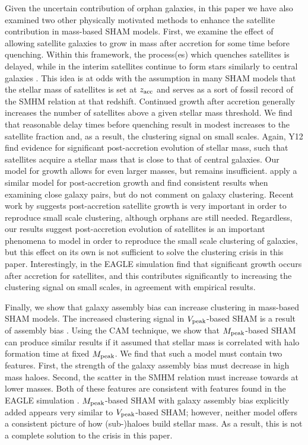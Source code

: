 \documentclass[useAMS,fleqn,usenatbib]{mnras}
\begin{document}
Given the uncertain contribution of orphan galaxies, in this paper we have also examined two other physically motivated methods to enhance the satellite contribution in mass-based SHAM models.  First, we examine the effect of allowing satellite galaxies to grow in mass after accretion for some time before quenching.  Within this framework, the process(es) which quenches satellites is delayed, while in the interim satellites continue to form stars similarly to central galaxies \citep{Wetzel:2013dw}.  This idea is at odds with the assumption in many SHAM models that the stellar mass of satellites is set at $z_{\rm acc}$ and serves as a sort of fossil record of the SMHM relation at that redshift.  Continued growth after accretion generally increases the number of satellites above a given stellar mass threshold.  We find that reasonable delay times before quenching result in modest increases to the satellite fraction and, as a result, the clustering signal on small scales.  Again, Y12 find evidence for significant post-accretion evolution of stellar mass, such that satellites acquire a stellar mass that is close to that of central galaxies.  Our model for growth allows for even larger masses, but remains insufficient.  \citet{Behroozi:2015wx} apply a similar model for post-accretion growth and find consistent results when examining close galaxy pairs, but do not comment on galaxy clustering.  Recent work by \citep{Moster:2017vz} suggests post-accretion satellite growth is very important in order to reproduce small scale clustering, although orphans are still needed.  Regardless, our results suggest post-accretion evolution of satellites is an important phenomena to model in order to reproduce the small scale clustering of galaxies, but this effect on its own is not sufficient to solve the clustering crisis in this paper.  Interestingly, in the EAGLE simulation \citet{ChavesMontero:2015dc} find that significant growth occurs after accretion for satellites, and this contributes significantly to increasing the clustering signal on small scales, in agreement with empirical results.         

Finally, we show that galaxy assembly bias can increase clustering in mass-based SHAM models.  The increased clustering signal in $V_{\rm peak}$-based SHAM is a result of assembly bias \citep{Zentner:2014ki,Lehmann:2017fy}.  Using the CAM technique, we show that $M_{\rm peak}$-based SHAM can produce similar results if it assumed that stellar mass is correlated with halo formation time at fixed $M_{\rm peak}$.  We find that such a model must contain two features.  First, the strength of the galaxy assembly bias must decrease in high mass haloes.  Second, the scatter in the SMHM relation must increase towards at lower masses.  Both of these features are consistent with features found in the EAGLE simulation \citep{Matthee:2016vm}.  $M_{\rm peak}$-based SHAM with galaxy assembly bias explicitly added appears very similar to $V_{\rm peak}$-based SHAM; however, neither model offers a consistent picture of how (sub-)haloes build stellar mass.  As a result, this is not a complete solution to the crisis in this paper.  
\end{document}
